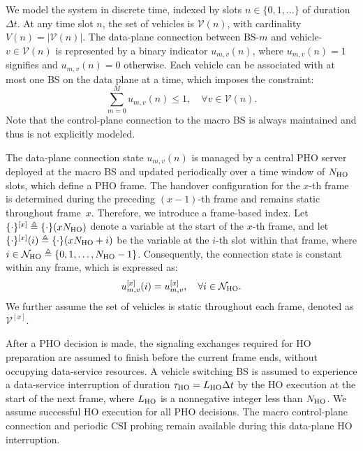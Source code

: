 \documentclass[conference, a4paper]{IEEEtran}
\newcommand{\rev}[1]{\textcolor{revisioncolor}{{}#1}}
\newif\ifshowdeletions
\newcommand{\currentdel}[1]{\ifshowdeletions\textcolor{deletioncolor}{\sout{#1}}\fi}
\theoremstyle{remark}
\begin{document}
We model the system in discrete time, indexed by slots $n \in \{0, 1, \dots\}$ of duration $\Delta t$. At any time slot $n$, the set of vehicles is $\mathcal{V}(n)$, with cardinality $V(n) = |\mathcal{V}(n)|$. The {data-plane}
connection between BS-$m$ and vehicle-$v \in \mathcal{V}(n)$ is represented by a binary indicator $u_{m,v}(n)$, where $u_{m,v}(n)=1$ signifies \currentdel{an active data-plane connection} and $u_{m,v}(n)=0$ otherwise. Each vehicle can be associated with at most one BS on the data plane at a time, which imposes the constraint:
\begin{equation}
    \sum_{m=0}^{M} u_{m,v}(n) \leq 1, \quad \forall v \in \mathcal{V}(n).
    \label{eq:connection_cons}
\end{equation}
Note that the control-plane connection to the macro BS is always maintained and thus is not explicitly modeled.

The data-plane connection state $u_{m,v}(n)$ is managed by a central PHO server deployed at the macro BS and updated periodically over a time window of $N_{\rm HO}$ slots, which define a PHO frame. The handover configuration for the $x$-th frame is determined during the preceding $(x-1)$-th frame and remains static throughout frame~$x$. Therefore, we introduce a frame-based index. Let $\{\cdot\}^{[x]} \triangleq \{\cdot\}(xN_{\rm HO})$ denote a variable at the start of the $x$-th frame, and let $\{\cdot\}^{[x]}(i) \triangleq \{\cdot\}(xN_{\rm HO} + i)$ be the variable at the $i$-th slot within that frame, where $i \in \mathcal{N}_{\rm HO} \triangleq \{0,1,\dots,N_{\rm HO}-1\}$. Consequently, the connection state is constant within any frame, which is expressed as:
    \begin{equation}
        u_{m,v}^{[x]}(i) = u_{m,v}^{[x]}, \quad \forall i \in \mathcal{N}_{\rm HO}.
        \label{eq:PHO_cons}
    \end{equation}
We further assume the set of vehicles is static throughout each frame, denoted as $\mathcal{V}^{[x]}$.

\rev{After a PHO decision is made, the signaling exchanges required for HO preparation are assumed to finish before the current frame ends, without occupying data-service resources. A vehicle switching BS is assumed to experience a data-service interruption of duration $\tau_{\rm HO}=L_{\rm HO}\Delta t$ by the HO execution at the start of the next frame, where $L_{\rm HO}$ is a nonnegative integer less than $N_{\rm HO}$. We assume successful HO execution for all PHO decisions. The macro control-plane connection and periodic CSI probing remain available during this data-plane HO interruption.}
\end{document}
